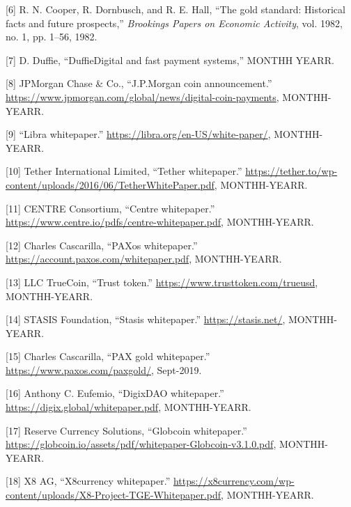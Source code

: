 \documentclass[english,]{IEEEtran}
\begin{document}
\hypertarget{ref-The_Gold_Standard}{}
{[}6{]} R. N. Cooper, R. Dornbusch, and R. E. Hall, ``The gold standard:
Historical facts and future prospects,'' \emph{Brookings Papers on
Economic Activity}, vol. 1982, no. 1, pp. 1--56, 1982.

\hypertarget{ref-DuffieDigital_and_Fast_Payment_Systems}{}
{[}7{]} D. Duffie, ``DuffieDigital and fast payment systems,'' MONTHH
YEARR.

\hypertarget{ref-JPMorgan_Coin:whitepaper}{}
{[}8{]} JPMorgan Chase \& Co., ``J.P.Morgan coin announcement.''
\url{https://www.jpmorgan.com/global/news/digital-coin-payments},
MONTHH-YEARR.

\hypertarget{ref-Libra:whitepaper}{}
{[}9{]} ``Libra whitepaper.''
\url{https://libra.org/en-US/white-paper/}, MONTHH-YEARR.

\hypertarget{ref-Tether:whitepaper}{}
{[}10{]} Tether International Limited, ``Tether whitepaper.''
\url{https://tether.to/wp-content/uploads/2016/06/TetherWhitePaper.pdf},
MONTHH-YEARR.

\hypertarget{ref-Centre:whitepaper}{}
{[}11{]} CENTRE Consortium, ``Centre whitepaper.''
\url{https://www.centre.io/pdfs/centre-whitepaper.pdf}, MONTHH-YEARR.

\hypertarget{ref-PAXos:whitepaper}{}
{[}12{]} Charles Cascarilla, ``PAXos whitepaper.''
\url{https://account.paxos.com/whitepaper.pdf}, MONTHH-YEARR.

\hypertarget{ref-TrueUSD:whitepaper}{}
{[}13{]} LLC TrueCoin, ``Trust token.''
\url{https://www.trusttoken.com/trueusd}, MONTHH-YEARR.

\hypertarget{ref-Stasis:whitepaper}{}
{[}14{]} STASIS Foundation, ``Stasis whitepaper.''
\url{https://stasis.net/}, MONTHH-YEARR.

\hypertarget{ref-PAXGold:whitepaper}{}
{[}15{]} Charles Cascarilla, ``PAX gold whitepaper.''
\url{https://www.paxos.com/paxgold/}, Sept-2019.

\hypertarget{ref-DigixDAO:whitepaper}{}
{[}16{]} Anthony C. Eufemio, ``DigixDAO whitepaper.''
\url{https://digix.global/whitepaper.pdf}, MONTHH-YEARR.

\hypertarget{ref-globcoin:whitepaper}{}
{[}17{]} Reserve Currency Solutions, ``Globcoin whitepaper.''
\url{https://globcoin.io/assets/pdf/whitepaper-Globcoin-v3.1.0.pdf},
MONTHH-YEARR.

\hypertarget{ref-x8currency:whitepaper}{}
{[}18{]} X8 AG, ``X8currency whitepaper.''
\url{https://x8currency.com/wp-content/uploads/X8-Project-TGE-Whitepaper.pdf},
MONTHH-YEARR.
\end{document}
